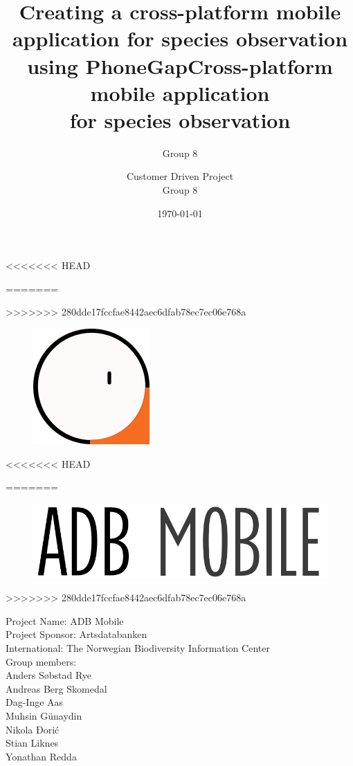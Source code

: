 \documentclass[a4paper]{article}
\begin{document}
<<<<<<< HEAD
  \title{Creating a cross-platform mobile application for species observation using PhoneGap}

=======
  \title{Cross-platform mobile application \\ for species observation}
  
>>>>>>> 280dde17fccfae8442aec6dfab78ec7ec06e768a
  \begin{figure}
    \centering
    \includegraphics[scale=1.0]{Logo_.png}
  \end{figure}
<<<<<<< HEAD

	\author{Group 8}
=======
  \begin{figure}
    \centering
    \includegraphics[scale=0.5]{ADB_Mobile_Logo.png}
  \end{figure}
	\author{Customer Driven Project \\ Group 8}
>>>>>>> 280dde17fccfae8442aec6dfab78ec7ec06e768a
	\date{\today}
	\maketitle
	\thispagestyle{empty}
	\pagebreak

	\pagestyle{empty}
	\begin{center}
		Project Name: ADB Mobile \\
		Project Sponsor: Artsdatabanken \\
		International: The Norwegian Biodiversity Information Center \\
    Group members: \\
    Anders Søbstad Rye\\
    Andreas Berg Skomedal\\
    Dag-Inge Aas\\
    Muhsin Günaydin\\
    Nikola Đorić\\
    Stian Liknes\\
    Yonathan Redda
	\end{center}
	\newpage
    
\end{document}
